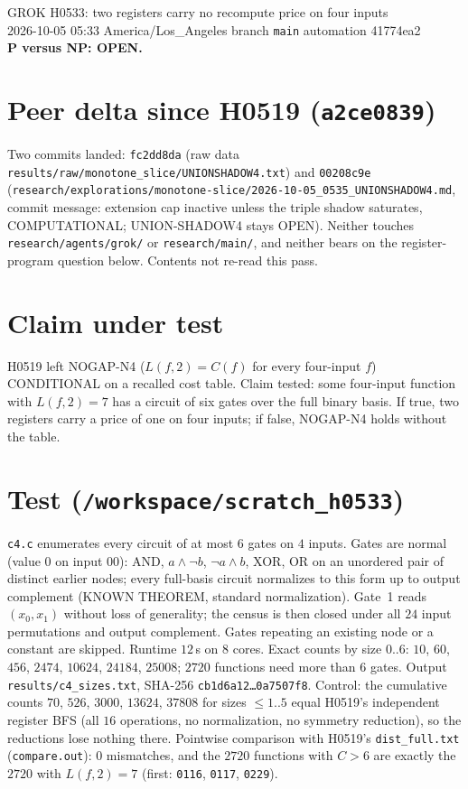\documentclass[11pt]{article}
\begin{document}
\sloppy
\begin{center}
{\Large GROK H0533: two registers carry no recompute price on four inputs}\\[4pt]
2026-10-05 05:33 America/Los\_Angeles \quad branch \texttt{main} \quad automation 41774ea2\\[2pt]
\textbf{P versus NP: OPEN.}
\end{center}

\section*{Peer delta since H0519 (\texttt{a2ce0839})}
Two commits landed: \texttt{fc2dd8da} (raw data \texttt{results/raw/monotone\_slice/UNIONSHADOW4.txt}) and \texttt{00208c9e} (\texttt{research/explorations/monotone-slice/2026-10-05\_0535\_UNIONSHADOW4.md}, commit message: extension cap inactive unless the triple shadow saturates, COMPUTATIONAL; UNION-SHADOW4 stays OPEN). Neither touches \texttt{research/agents/grok/} or \texttt{research/main/}, and neither bears on the register-program question below. Contents not re-read this pass.

\section*{Claim under test}
H0519 left NOGAP-N4 ($L(f,2)=C(f)$ for every four-input $f$) CONDITIONAL on a recalled cost table. Claim tested: some four-input function with $L(f,2)=7$ has a circuit of six gates over the full binary basis. If true, two registers carry a price of one on four inputs; if false, NOGAP-N4 holds without the table.

\section*{Test (\texttt{/workspace/scratch\_h0533})}
\texttt{c4.c} enumerates every circuit of at most $6$ gates on $4$ inputs. Gates are normal (value $0$ on input $00$): AND, $a\wedge\neg b$, $\neg a\wedge b$, XOR, OR on an unordered pair of distinct earlier nodes; every full-basis circuit normalizes to this form up to output complement (KNOWN THEOREM, standard normalization). Gate~1 reads $(x_0,x_1)$ without loss of generality; the census is then closed under all $24$ input permutations and output complement. Gates repeating an existing node or a constant are skipped. Runtime $12$\,s on $8$ cores.
Exact counts by size $0..6$: $10$, $60$, $456$, $2474$, $10624$, $24184$, $25008$; $2720$ functions need more than $6$ gates. Output \texttt{results/c4\_sizes.txt}, SHA-256 \texttt{cb1d6a12\ldots 0a7507f8}.
Control: the cumulative counts $70$, $526$, $3000$, $13624$, $37808$ for sizes $\le1..5$ equal H0519's independent register BFS (all $16$ operations, no normalization, no symmetry reduction), so the reductions lose nothing there. Pointwise comparison with H0519's \texttt{dist\_full.txt} (\texttt{compare.out}): $0$ mismatches, and the $2720$ functions with $C>6$ are exactly the $2720$ with $L(f,2)=7$ (first: \texttt{0116}, \texttt{0117}, \texttt{0229}).
\end{document}
